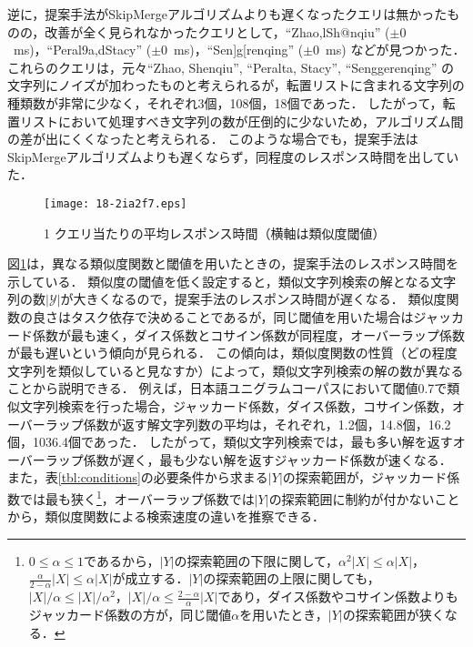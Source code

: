 \documentclass[japanese]{jnlp_JS2.0}
\begin{document}
逆に，提案手法がSkipMergeアルゴリズムよりも遅くなったクエリは無かったものの，改善が全く見られなかったクエリとして，``Zhao,lSh@nqiu'' ($\pm 0$~ms)，``Peral9a,dStacy'' ($\pm 0$~ms)，``Sen]g[renqing'' ($\pm 0$~ms) などが見つかった．
これらのクエリは，元々``Zhao, Shenqiu'', ``Peralta, Stacy'', ``Senggerenqing'' の文字列にノイズが加わったものと考えられるが，転置リストに含まれる文字列の種類数が非常に少なく，それぞれ3個，108個，18個であった．
したがって，転置リストにおいて処理すべき文字列の数が圧倒的に少ないため，アルゴリズム間の差が出にくくなったと考えられる．
このような場合でも，提案手法はSkipMergeアルゴリズムよりも遅くならず，同程度のレスポンス時間を出していた．

\begin{figure}[b]
    \begin{center}
\texttt{[image: 18-2ia2f7.eps]}
    \end{center}
    \caption{1 クエリ当たりの平均レスポンス時間（横軸は類似度閾値）}
\label{fig:query-time-sim}
\end{figure}

図\ref{fig:query-time-sim}は，異なる類似度関数と閾値を用いたときの，提案手法のレスポンス時間を示している．
類似度の閾値を低く設定すると，類似文字列検索の解となる文字列の数$|\mathcal{Y}|$が大きくなるので，提案手法のレスポンス時間が遅くなる．
類似度関数の良さはタスク依存で決めることであるが，同じ閾値を用いた場合はジャッカード係数が最も速く，ダイス係数とコサイン係数が同程度，オーバーラップ係数が最も遅いという傾向が見られる．
この傾向は，類似度関数の性質（どの程度文字列を類似していると見なすか）によって，類似文字列検索の解の数が異なることから説明できる．
例えば，日本語ユニグラムコーパスにおいて閾値0.7で類似文字列検索を行った場合，ジャッカード係数，ダイス係数，コサイン係数，オーバーラップ係数が返す解文字列数の平均は，それぞれ，1.2個，14.8個，16.2個，1036.4個であった．
したがって，類似文字列検索では，最も多い解を返すオーバーラップ係数が遅く，最も少ない解を返すジャッカード係数が速くなる．
また，表\ref{tbl:conditions}の必要条件から求まる$|Y|$の探索範囲が，ジャッカード係数では最も狭く\footnote{$0 \leq \alpha \leq 1$であるから，$|Y|$の探索範囲の下限に関して，$\alpha^2|X| \leq \alpha |X|$，$\frac{\alpha}{2 - \alpha}|X| \leq \alpha |X|$が成立する．$|Y|$の探索範囲の上限に関しても，$|X|/\alpha \leq |X|/\alpha^2$，$|X|/\alpha \leq \frac{2 - \alpha}{\alpha}|X|$であり，ダイス係数やコサイン係数よりもジャッカード係数の方が，同じ閾値$\alpha$を用いたとき，$|Y|$の探索範囲が狭くなる．}，オーバーラップ係数では$|Y|$の探索範囲に制約が付かないことから，類似度関数による検索速度の違いを推察できる．
\end{document}
